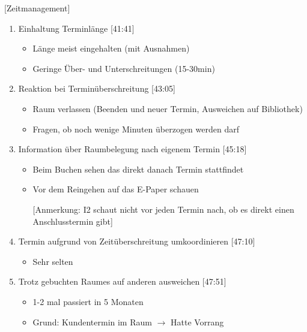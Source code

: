 [Zeitmanagement]

\begin{enumerate}

    \item Einhaltung Terminlänge [41:41]
     \begin{itemize}
        \item Länge meist eingehalten (mit Ausnahmen)
        \item Geringe Über- und Unterschreitungen (15-30min)
    \end{itemize}
    
    \item Reaktion bei Terminüberschreitung [43:05]
     \begin{itemize}
        \item Raum verlassen (Beenden und neuer Termin, Ausweichen auf Bibliothek)
        \item Fragen, ob noch wenige Minuten überzogen werden darf
    \end{itemize}
    
    \item Information über Raumbelegung nach eigenem Termin [45:18]
     \begin{itemize}
        \item Beim Buchen sehen das direkt danach Termin stattfindet
        \item Vor dem Reingehen auf das E-Paper schauen
        \item[] [Anmerkung: I2 schaut nicht vor jeden Termin nach, ob es direkt einen Anschlusstermin gibt]
    \end{itemize}
    
    \item Termin aufgrund von Zeitüberschreitung umkoordinieren [47:10]
     \begin{itemize}
        \item Sehr selten
    \end{itemize}

    \item Trotz gebuchten Raumes auf anderen ausweichen [47:51]
     \begin{itemize}
        \item 1-2 mal passiert in 5 Monaten
        \item Grund: Kundentermin im Raum $\rightarrow$ Hatte Vorrang 
    \end{itemize}

\end{enumerate}

